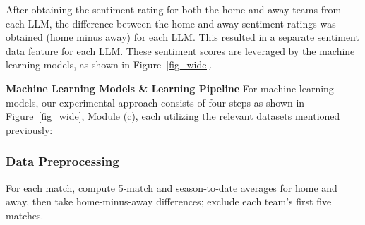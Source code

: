 \documentclass[conference]{IEEEtran}
\begin{document}
After obtaining the sentiment rating for both the home and away teams from each LLM, the difference between the home and away sentiment ratings was obtained (home minus away) for each LLM. This resulted in a separate sentiment data feature for each LLM. These sentiment scores are leveraged by the machine learning models, as shown in Figure~\ref{fig_wide}.

\noindent\textbf{Machine Learning
Models \& Learning Pipeline
}
For machine learning models, our experimental approach consists of four steps as shown in Figure~\ref{fig_wide}, Module (c), each utilizing the relevant datasets mentioned previously:



\subsubsection{Data Preprocessing}
For each match, compute 5‑match and season‑to‑date averages for home and away, then take home‑minus‑away differences; exclude each team’s first five matches.
\end{document}
